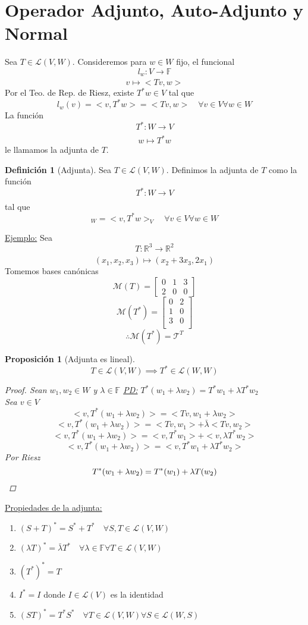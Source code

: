 \documentclass[11pt]{book}
\newcommand{\set}[1]{\mathbb{#1}}
\newcommand{\func}[5]{#1:#2\xrightarrow[#5]{#4}#3}
\newtheorem{prop}[thm]{Proposición}
\theoremstyle{definition}
\newtheorem{defn}{Definición}[section]
\begin{document}
\section{Operador Adjunto, Auto-Adjunto y Normal}
Sea $T\in\mathcal{L}(V,W)$. Consideremos para $w\in W$ fijo, el funcional
\[\func{l_w}{V}{\set{F}}{}{}\]
\[v\mapsto <Tv,w>\]
Por el Teo. de Rep. de Riesz, existe $T^*w\in V$ tal que
\[l_w(v)=<v,T^*w>=<Tv,w>\quad\forall v\in V\forall w\in W\]
La función
\[\func{T^*}{W}{V}{}{}\]
\[w\mapsto T^*w\]
le llamamos la adjunta de $T$.
\begin{defn}[Adjunta]
	Sea $T\in\mathcal{L}(V,W)$. Definimos la adjunta de $T$ como la función
	\[\func{T^*}{W}{V}{}{}\]
	tal que 
	\[<Tv,w>_W=<v,T^* w>_V\quad\forall v\in V\forall w\in W\]
\end{defn}
\underline{Ejemplo:} Sea
\[\func{T}{\set{R}^3}{\set{R}^2}{}{}\]
\[(x_1,x_2,x_3)\mapsto (x_2+3x_3,2x_1)\]
Tomemos bases canónicas
\[\mathcal{M}(T)=\begin{bmatrix}
	0 & 1 & 3\\
	2 & 0 & 0
\end{bmatrix}\]
\[\mathcal{M}(T^*)=\begin{bmatrix}
	0 & 2\\
	1 & 0\\
	3 & 0\\
\end{bmatrix}\]
\[\therefore \mathcal{M}(T^*)=\mathcal{T}^T\]
\begin{prop}[Adjunta es lineal]
	\[T\in\mathcal{L}(V,W)\implies T^*\in\mathcal{L}(W,W)\]
	\begin{proof}
		Sean $w_1,w_2\in W$ y $\lambda\in\set{F}$
		\underline{PD:} $T^*(w_1+\lambda w_2)=T^*w_1+\lambda T^*w_2$\\
		Sea $v\in V$
		\[<v,T^*(w_1+\lambda w_2)>=<Tv,w_1+\lambda w_2>\]
		\[<v,T^*(w_1+\lambda w_2)>=<Tv,w_1>+\bar{\lambda}<Tv,w_2>\]
		\[<v,T^*(w_1+\lambda w_2)>=<v,T^*w_1>+<v,\lambda T^*w_2>\]
		\[<v,T^*(w_1+\lambda w_2)>=<v,T^*w_1+\lambda T^*w_2>\]
		Por Riesz
		\[T^*(w_1+\lambda w_2)=T^*(w_1)+\lambda T(w_2)\qedhere\]
	\end{proof}
\end{prop}
\underline{Propiedades de la adjunta:}
\begin{enumerate}[label=\alph*)]
	\item $(S+T)^*=S^*+T^*\quad\forall S,T\in \mathcal{L}(V,W)$

	\item $(\lambda T)^*=\bar{\lambda}T^*\quad\forall\lambda\in\set{F}\forall T\in\mathcal{L}(V,W)$

	\item $(T^*)^*=T$

	\item $I^*=I$ donde $I\in\mathcal{L}(V)$ es la identidad

	\item $(ST)^*=T^*S^*\quad\forall T\in\mathcal{L}(V,W)\forall S\in\mathcal{L}(W,S)$
\end{enumerate}
\end{document}
